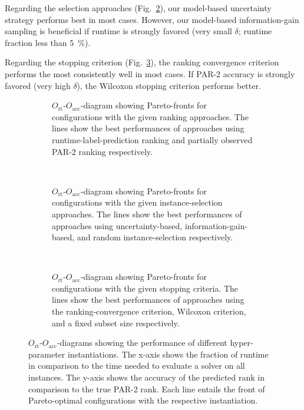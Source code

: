 \documentclass[runningheads]{llncs}
\begin{document}
Regarding the selection approaches (Fig.~\ref{fig:annitraincolorselection}), our model-based uncertainty strategy performs best in most cases.
However, our model-based information-gain sampling is beneficial if runtime is strongly favored (very small $\delta$; runtime fraction less than \SI{5}{\%}).

Regarding the stopping criterion (Fig.~\ref{fig:annitraincolorstopping}), the ranking convergence criterion performs the most consistently well in most cases.
If PAR-2 accuracy is strongly favored (very high $\delta$), the Wilcoxon stopping criterion performs better.

\begin{figure}[tbp!]
  \centering
  \begin{subfigure}{1.0\textwidth}
    \caption{$O_{\operatorname{rt}}$-$O_{\operatorname{acc}}$-diagram showing Pareto-fronts for configurations with the given ranking approaches. The lines show the best performances of approaches using runtime-label-prediction ranking and partially observed PAR-2 ranking respectively.}
    \label{fig:annitraincolorranking}
  \end{subfigure}
  \\
  \vspace{0.2cm}
  \begin{subfigure}{1.0\textwidth}
    \caption{$O_{\operatorname{rt}}$-$O_{\operatorname{acc}}$-diagram showing Pareto-fronts for configurations with the given instance-selection approaches. The lines show the best performances of approaches using uncertainty-based, information-gain-based, and random instance-selection respectively.}
    \label{fig:annitraincolorselection}
  \end{subfigure}
  \\
  \vspace{0.2cm}
  \begin{subfigure}{1.0\textwidth}
    \caption{$O_{\operatorname{rt}}$-$O_{\operatorname{acc}}$-diagram showing Pareto-fronts for configurations with the given stopping criteria. The lines show the best performances of approaches using the ranking-convergence criterion, Wilcoxon criterion, and a fixed subset size respectively.}
    \label{fig:annitraincolorstopping}
  \end{subfigure}

  \caption{$O_{\operatorname{rt}}$-$O_{\operatorname{acc}}$-diagrams showing the performance of different hyper-parameter instantiations. The x-axis shows the fraction of runtime in comparison to the time needed to evaluate a solver on all instances. The y-axis shows the accuracy of the predicted rank in comparison to the true PAR-2 rank. Each line entails the front of Pareto-optimal configurations with the respective instantiation.}
  \label{fig:e2eallsolvers}
\end{figure}
\end{document}
